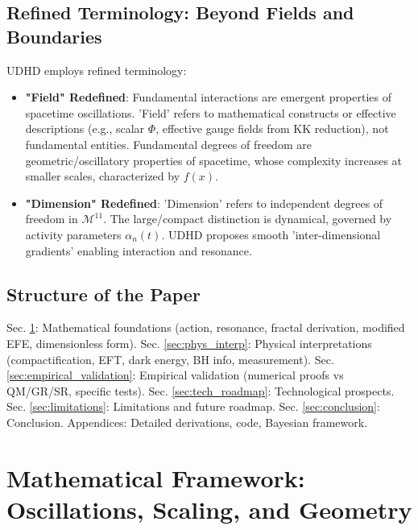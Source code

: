 \documentclass[12pt, a4paper]{article} %
\begin{document}
\subsection{Refined Terminology: Beyond Fields and Boundaries}
\label{sec:terminology}
UDHD employs refined terminology:
\begin{itemize}
    \item \textbf{"Field" Redefined}: Fundamental interactions are emergent properties of spacetime oscillations. 'Field' refers to mathematical constructs or effective descriptions (e.g., scalar \( \Phi \), effective gauge fields from KK reduction), not fundamental entities. Fundamental degrees of freedom are geometric/oscillatory properties of spacetime, whose complexity increases at smaller scales, characterized by \(f(x)\).
    \item \textbf{"Dimension" Redefined}: 'Dimension' refers to independent degrees of freedom in \( \mathcal{M}^{11} \). The large/compact distinction is dynamical, governed by activity parameters \( \alpha_n(t) \). UDHD proposes smooth 'inter-dimensional gradients' enabling interaction and resonance.
\end{itemize}

\subsection{Structure of the Paper}
Sec. \ref{sec:math_framework}: Mathematical foundations (action, resonance, fractal derivation, modified EFE, dimensionless form). Sec. \ref{sec:phys_interp}: Physical interpretations (compactification, EFT, dark energy, BH info, measurement). Sec. \ref{sec:empirical_validation}: Empirical validation (numerical proofs vs QM/GR/SR, specific tests). Sec. \ref{sec:tech_roadmap}: Technological prospects. Sec. \ref{sec:limitations}: Limitations and future roadmap. Sec. \ref{sec:conclusion}: Conclusion. Appendices: Detailed derivations, code, Bayesian framework.

\section{Mathematical Framework: Oscillations, Scaling, and Geometry}
\label{sec:math_framework}
\end{document}
